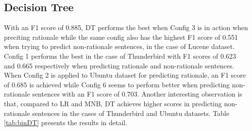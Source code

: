 \documentclass[a4paper,12pt,twoside]{report}
\begin{document}
\subsection{Decision Tree}
With an F1 score of 0.885, DT performs the best when Config 3 is in action when preciting rationale while the same config also has the highest F1 score of 0.551 when trying to predict non-rationale sentences, in the case of Lucene dataset. Config 1 performs the best in the case of Thunderbird with F1 scores of 0.623 and 0.665 respectively when predicting rationale and non-rationale sentences. When Config 2 is applied to Ubuntu dataset for predicting rationale, an F1 score of 0.685 is achieved while Config 6 seems to perform better when predicting non-rationale sentences with an F1 score of 0.703. Another interesting observation is that, compared to LR and MNB, DT achieves higher scores in predicting non-rationale sentences in the cases of Thunderbird and Ubuntu datasets. Table \ref{tab:binDT} presents the results in detail. 
\end{document}
